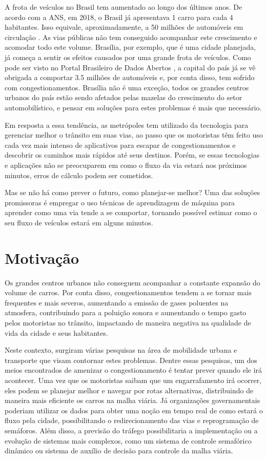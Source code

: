 A frota  de  veículos no Brasil tem aumentado ao longo  dos últimos anos. De acordo com a \acrfull{ANS}, em 2018, o Brasil já apresentava 1 carro para cada 4 habitantes. Isso equivale, aproximadamente, a 50 milhões de automóveis em circulação \cite{G1}. As vias públicas não tem conseguido acompanhar este crescimento e acomodar todo este volume. Brasília, por exemplo, que é uma cidade planejada, já começa a sentir os efeitos causados por uma grande frota de veículos. Como pode ser visto no Portal Brasileiro de Dados Abertos \cite{detran_2018}, a capital do país já se vê obrigada a comportar 3.5 milhões de automóveis e, por conta disso, tem sofrido com congestionamentos. Brasília não é uma exceção, todos os grandes centros urbanos do país estão sendo afetados pelas mazelas do crescimento do setor automobilístico, e pensar em soluções para estes problemas é mais que necessário.

 Em resposta a essa tendência, as metrópoles tem utilizado da tecnologia para gerenciar melhor o trânsito em suas vias, ao passo que os motoristas têm feito uso cada vez mais intenso de aplicativos para escapar de congestionamentos e descobrir os caminhos mais rápidos até seus destinos. Porém, se essas tecnologias e aplicações não se preocuparem em como o fluxo da via estará nos próximos minutos, erros de cálculo podem ser cometidos.

Mas se não há como prever o futuro, como planejar-se melhor? Uma das soluções promissoras é empregar o uso técnicas de aprendizagem de máquina para aprender como uma via tende a se comportar, tornando possível estimar como o seu fluxo de veículos estará em alguns minutos.

\section{Motivação}

Os grandes centros urbanos não conseguem acompanhar a constante expansão do volume de carros. Por conta disso, congestionamentos tendem a se tornar mais frequentes e mais severos, aumentando a emissão de gases poluentes na atmosfera, contribuindo para a poluição sonora e aumentando o tempo gasto pelos motoristas no trânsito, impactando de maneira negativa na qualidade de vida da cidade e seus habitantes.

Neste contexto, surgiram várias pesquisas na área de mobilidade urbana e transporte que visam contornar estes problemas. Dentre essas pesquisas, um dos meios encontrados de amenizar o congestionamento é tentar prever quando ele irá acontecer. Uma vez que os motoristas saibam que um engarrafamento irá ocorrer, eles podem se planejar melhor e navegar por rotas alternativas, distribuindo de maneira mais eficiente os carros na malha viária. Já organizações governamentais poderiam utilizar os dados para obter uma noção em tempo real de como estará o fluxo pela cidade, possibilitando o redirecionamento das vias e reprogramação de semáforos. Além disso, a previsão do tráfego possibilitaria a implementação ou a evolução de sistemas mais complexos, como um sistema de controle semafórico dinâmico ou sistema de auxílio de decisão para controle da malha viária.

